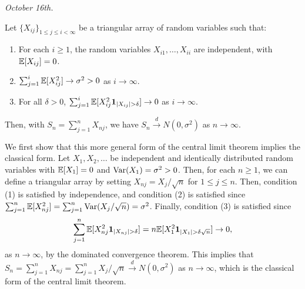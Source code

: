 \textit{October 16th.}

\begin{theorem}
    Let $\{X_{ij}\}_{1 \leq j \leq i < \infty}$ be a triangular array of random variables such that:
    \begin{enumerate}
        \item For each $i \geq 1$, the random variables $X_{i1},\ldots,X_{ii}$ are independent, with $\mathbb{E}[X_{ij}] = 0$.
        \item $\sum_{j=1}^{i}\mathbb{E}[X_{ij}^{2}] \to \sigma^{2} > 0$ as $i \to \infty$.
        \item For all $\delta > 0$, $\sum_{j=1}^{i} \mathbb{E}[X_{ij}^{2}\textbf{1}_{\left| X_{ij} \right| > \delta}] \to 0$ as $i \to \infty$.
    \end{enumerate}
    Then, with $S_{n} = \sum_{j=1}^{n}X_{nj}$, we have $S_{n} \xrightarrow{d} N(0,\sigma^{2})$ as $n \to \infty$.
\end{theorem}

We first show that this more general form of the central limit theorem implies the classical form. Let $X_{1},X_{2},\ldots$ be independent and identically distributed random variables with $\mathbb{E}[X_{1}] = 0$ and $\operatorname{Var}(X_{1}) = \sigma^{2} > 0$. Then, for each $n \geq 1$, we can define a triangular array by setting $X_{nj} = X_{j}/\sqrt{n}$ for $1 \leq j \leq n$. Then, condition (1) is satisfied by independence, and condition (2) is satisfied since $\sum_{j=1}^{n}\mathbb{E}[X_{nj}^{2}] = \sum_{j=1}^{n}\operatorname{Var}(X_{j}/\sqrt{n}) = \sigma^{2}$. Finally, condition (3) is satisfied since
\begin{align}
    \sum_{j=1}^{n} \mathbb{E}[X_{nj}^{2}\textbf{1}_{\left| X_{nj} \right| > \delta}] = n\mathbb{E}[X_{1}^{2}\textbf{1}_{\left| X_{1} \right| > \delta\sqrt{n}}] \to 0,
\end{align}
as $n \to \infty$, by the dominated convergence theorem. This implies that $S_{n} = \sum_{j=1}^{n}X_{nj} = \sum_{j=1}^{n}X_{j}/\sqrt{n} \xrightarrow{d} N(0,\sigma^{2})$ as $n \to \infty$, which is the classical form of the central limit theorem.

